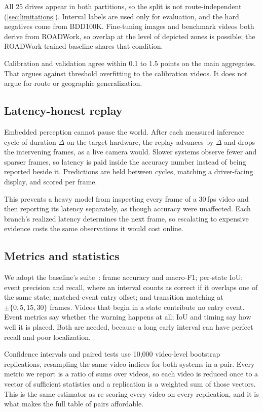 \documentclass[journal]{IEEEtran}
\begin{document}
All 25 drives appear in both partitions, so the split is not route-independent (\cref{sec:limitations}).  Interval labels are used only for evaluation, and the hard negatives come from BDD100K.  Fine-tuning images and benchmark videos both derive from ROADWork, so overlap at the level of depicted zones is possible; the ROADWork-trained baseline shares that condition.

Calibration and validation agree within 0.1 to 1.5 points on the main aggregates.  That argues against threshold overfitting to the calibration videos.  It does not argue for route or geographic generalization.

\subsection{Latency-honest replay}
Embedded perception cannot pause the world.  After each measured inference cycle of duration $\Delta$ on the target hardware, the replay advances by $\Delta$ and drops the intervening frames, as a live camera would.  Slower systems observe fewer and sparser frames, so latency is paid inside the accuracy number instead of being reported beside it.  Predictions are held between cycles, matching a driver-facing display, and scored per frame.

This prevents a heavy model from inspecting every frame of a 30\,fps video and then reporting its latency separately, as though accuracy were unaffected.  Each branch's realized latency determines the next frame, so escalating to expensive evidence costs the same observations it would cost online.

\subsection{Metrics and statistics}
We adopt the baseline's suite~\cite{priorsystem2026}: frame accuracy and macro-F1; per-state IoU; event precision and recall, where an interval counts as correct if it overlaps one of the same state; matched-event entry offset; and transition matching at $\pm\{0,5,15,30\}$ frames.  Videos that begin in a state contribute no entry event.  Event metrics say whether the warning happens at all; IoU and timing say how well it is placed.  Both are needed, because a long early interval can have perfect recall and poor localization.

Confidence intervals and paired tests use 10{,}000 video-level bootstrap replications, resampling the same video indices for both systems in a pair. Every metric we report is a ratio of sums over videos, so each video is reduced once to a vector of sufficient statistics and a replication is a weighted sum of those vectors.  This is the same estimator as re-scoring every video on every replication, and it is what makes the full table of pairs affordable.
\end{document}
